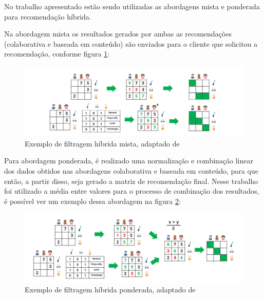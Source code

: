 No trabalho apresentado estão sendo utilizadas as abordagens mista e ponderada para recomendação híbrida.

Na abordagem mista os resultados gerados por ambas as recomendações (colaborativa e baseada em conteúdo) são enviados para o cliente que solicitou a recomendação, conforme figura \ref{fig:algoritmohibridomisto}:

\begin{figure}[H]
	\centering
	\includegraphics[width=1\linewidth]{imagens/hibridamista.png}
	\caption[Exemplo de filtragem híbrida mista]{Exemplo de filtragem híbrida mista, adaptado de \cite{araujo2011apprecommender}}
    \label{fig:algoritmohibridomisto}
\end{figure}

Para abordagem ponderada, é realizado uma normalização e combinação linear dos dados obtidos nas abordagens colaborativa e baseada em conteúdo, para que então, a partir disso, seja gerado a matriz de recomendação final. Nesse trabalho foi utilizado a média entre valores para o processo de combinação dos resultados, é possível ver um exemplo dessa abordagem na figura \ref{fig:algoritmohibridoponderado}:

\begin{figure}[H]
	\centering
	\includegraphics[width=1\linewidth]{imagens/hibridaponderada.png}
	\caption[Exemplo de filtragem híbrida ponderada]{Exemplo de filtragem híbrida ponderada, adaptado de \cite{araujo2011apprecommender}}
    \label{fig:algoritmohibridoponderado}
\end{figure}